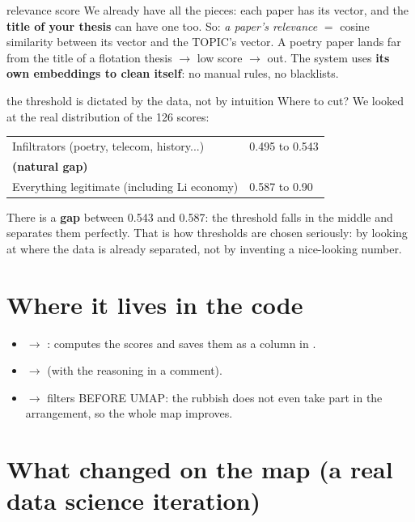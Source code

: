 \documentclass[11pt,a4paper]{article}
\begin{document}
\begin{concepto}{relevance score}
We already have all the pieces: each paper has its vector, and the \textbf{title of your
thesis} can have one too. So: \emph{a paper's relevance} $=$ cosine similarity between its
vector and the TOPIC's vector. A poetry paper lands far from the title of a flotation thesis
$\rightarrow$ low score $\rightarrow$ out. The system uses \textbf{its own embeddings to clean
itself}: no manual rules, no blacklists.
\end{concepto}

\begin{concepto}{the threshold is dictated by the data, not by intuition}
Where to cut? We looked at the real distribution of the 126 scores:
\begin{center}
\begin{tabular}{ll}
Infiltrators (poetry, telecom, history...) & 0.495 to 0.543 \\
\textbf{(natural gap)} & \\
Everything legitimate (including Li economy) & 0.587 to 0.90 \\
\end{tabular}
\end{center}
There is a \textbf{gap} between 0.543 and 0.587: the threshold
 falls in the middle and separates them perfectly. That is
how thresholds are chosen seriously: by looking at where the data is already separated, not by
inventing a nice-looking number.
\end{concepto}

\section{Where it lives in the code}

\begin{itemize}
  \item {} $\rightarrow$ : computes the scores and
        saves them as a  column in .
  \item {} $\rightarrow$  (with the
        reasoning in a comment).
  \item {} $\rightarrow$ filters BEFORE UMAP: the rubbish does not even take
        part in the arrangement, so the whole map improves.
\end{itemize}

\section{What changed on the map (a real data science iteration)}
\end{document}
